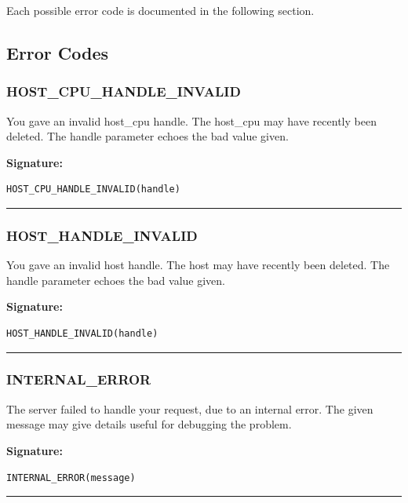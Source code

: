 Each possible error code is documented in the following section.

\subsection{Error Codes}

\subsubsection{HOST\_CPU\_HANDLE\_INVALID}

You gave an invalid host\_cpu handle.  The host\_cpu may have recently been
deleted.  The handle parameter echoes the bad value given.

\vspace{0.3cm}
{\bf Signature:}
\begin{verbatim}HOST_CPU_HANDLE_INVALID(handle)\end{verbatim}
\begin{center}\rule{10em}{0.1pt}\end{center}

\subsubsection{HOST\_HANDLE\_INVALID}

You gave an invalid host handle.  The host may have recently been deleted. 
The handle parameter echoes the bad value given.

\vspace{0.3cm}
{\bf Signature:}
\begin{verbatim}HOST_HANDLE_INVALID(handle)\end{verbatim}
\begin{center}\rule{10em}{0.1pt}\end{center}

\subsubsection{INTERNAL\_ERROR}

The server failed to handle your request, due to an internal error.  The
given message may give details useful for debugging the problem.

\vspace{0.3cm}
{\bf Signature:}
\begin{verbatim}INTERNAL_ERROR(message)\end{verbatim}
\begin{center}\rule{10em}{0.1pt}\end{center}

